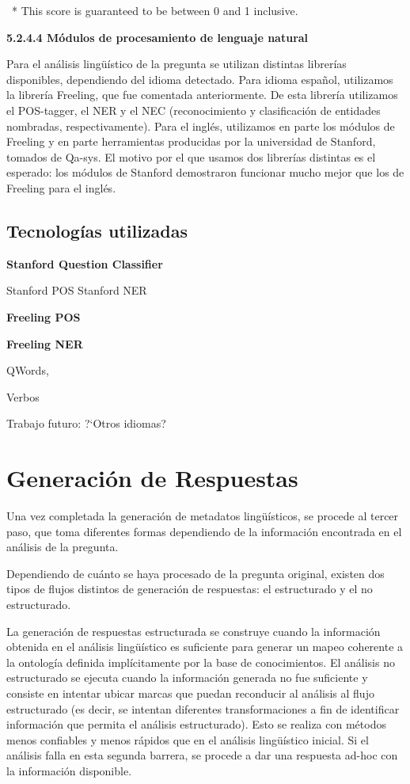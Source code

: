 \ * This score is guaranteed to be between 0 and 1 inclusive.


\bigskip

\textbf{5.2.4.4 M\'odulos de procesamiento de lenguaje natural}

Para el an\'alisis ling\"u\'istico de la pregunta se utilizan distintas
librer\'ias disponibles, dependiendo del idioma detectado. Para idioma
espa\~nol, utilizamos la librer\'ia Freeling, que fue comentada
anteriormente. De esta librer\'ia utilizamos el POS-tagger, el NER y el
NEC (reconocimiento y clasificaci\'on de entidades nombradas,
respectivamente). Para el ingl\'es, utilizamos en parte los m\'odulos
de Freeling y en parte herramientas producidas por la universidad de
Stanford, tomados de Qa-sys. El motivo por el que usamos dos
librer\'ias distintas es el esperado: los m\'odulos de Stanford
demostraron funcionar mucho mejor que los de Freeling para el ingl\'es.

\subsection{Tecnolog\'ias utilizadas}


\bigskip

\textbf{Stanford Question Classifier }


Stanford POS\newline
Stanford NER

\textbf{Freeling POS}

\textbf{Freeling NER}

QWords, 

Verbos

Trabajo futuro: ?`Otros idiomas?


\bigskip

\section{Generaci\'on de Respuestas}

Una vez completada la generaci\'on de
metadatos ling\"u\'isticos, se procede al tercer paso, que toma
diferentes formas dependiendo de la informaci\'on encontrada en el
an\'alisis de la pregunta.


Dependiendo de cu\'anto se haya procesado de la pregunta original,
existen dos tipos de flujos distintos de generaci\'on de respuestas: el
estructurado y el no estructurado.

La generaci\'on de respuestas estructurada se construye cuando la
informaci\'on obtenida en el an\'alisis ling\"u\'istico es suficiente
para generar un mapeo coherente a la ontolog\'ia definida
impl\'icitamente por la base de conocimientos. El an\'alisis no
estructurado se ejecuta cuando la informaci\'on generada no fue
suficiente y consiste en intentar ubicar marcas que puedan reconducir
al an\'alisis al flujo estructurado (es decir, se intentan diferentes
transformaciones a fin de identificar informaci\'on que permita el
an\'alisis estructurado). Esto se realiza con m\'etodos menos
confiables y menos r\'apidos que en el an\'alisis ling\"u\'istico
inicial. Si el an\'alisis falla en esta segunda barrera, se procede a
dar una respuesta ad-hoc con la informaci\'on disponible. 

